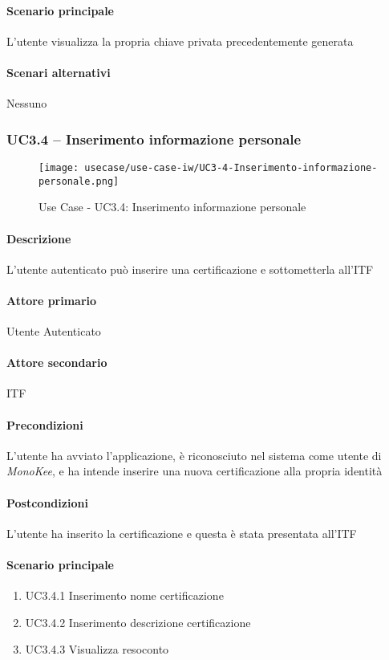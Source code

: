 \paragraph{Scenario principale}  
L’utente visualizza la propria chiave privata precedentemente generata
\paragraph{Scenari alternativi}  Nessuno



\subsubsection{UC3.4 – Inserimento informazione personale}
\begin{figure}[!htbp] 
    \centering 
    \texttt{[image: usecase/use-case-iw/UC3-4-Inserimento-informazione-personale.png]} 
    \caption{Use Case - UC3.4: Inserimento informazione personale}
\end{figure}

\paragraph{Descrizione}  L’utente autenticato può inserire una certificazione e sottometterla all’ITF
\paragraph{Attore primario}  Utente Autenticato
\paragraph{Attore secondario}  ITF
\paragraph{Precondizioni}  L’utente ha avviato l’applicazione, è riconosciuto nel sistema come utente di \textit{MonoKee}, e ha intende inserire una nuova certificazione alla propria identità
\paragraph{Postcondizioni}  L’utente ha inserito la certificazione e questa è stata presentata all’ITF
\paragraph{Scenario principale}  
    \begin{enumerate}
        \item UC3.4.1 Inserimento nome certificazione
        \item UC3.4.2 Inserimento descrizione certificazione
        \item UC3.4.3 Visualizza resoconto
    \end{enumerate}
